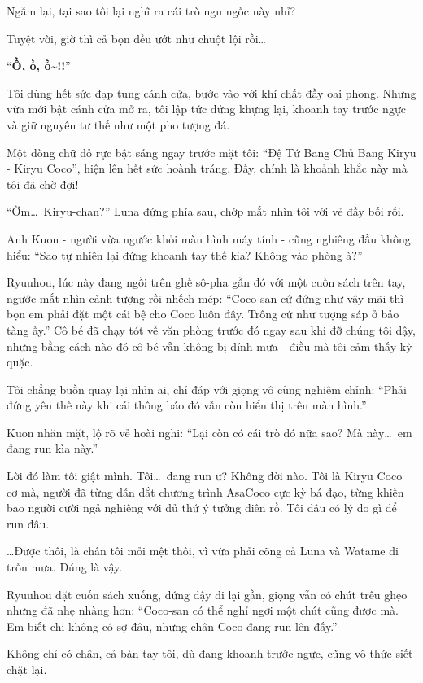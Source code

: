 \documentclass[../main.tex]{subfiles}
\begin{document}
Ngẫm lại, tại sao tôi lại nghĩ ra cái trò ngu ngốc này nhỉ?

Tuyệt vời, giờ thì cả bọn đều ướt như chuột lội rồi\dots

\ct

``\textbf{Ồ, ồ, ồ\~{}!!}''

Tôi dùng hết sức đạp tung cánh cửa, bước vào với khí chất đầy oai phong. Nhưng vừa mới bật cánh cửa mở ra, tôi lập tức đứng khựng lại, khoanh tay trước ngực và giữ nguyên tư thế như một pho tượng đá.

Một dòng chữ đỏ rực bật sáng ngay trước mặt tôi: ``Đệ Tứ Bang Chủ Bang Kiryu - Kiryu Coco'', hiện lên hết sức hoành tráng. Đấy, chính là khoảnh khắc này mà tôi đã chờ đợi!

``Ờm\dots\ Kiryu-chan?'' Luna đứng phía sau, chớp mắt nhìn tôi với vẻ đầy bối rối.

Anh Kuon - người vừa ngước khỏi màn hình máy tính - cũng nghiêng đầu không hiểu: ``Sao tự nhiên lại đứng khoanh tay thế kia? Không vào phòng à?''

Ryuuhou, lúc này đang ngồi trên ghế sô-pha gần đó với một cuốn sách trên tay, ngước mắt nhìn cảnh tượng rồi nhếch mép: ``Coco-san cứ đứng như vậy mãi thì bọn em phải đặt một cái bệ cho Coco luôn đây. Trông cứ như tượng sáp ở bảo tàng ấy.'' Cô bé đã chạy tót về văn phòng trước đó ngay sau khi đỡ chúng tôi dậy, nhưng bằng cách nào đó cô bé vẫn không bị dính mưa - điều mà tôi cảm thấy kỳ quặc.


Tôi chẳng buồn quay lại nhìn ai, chỉ đáp với giọng vô cùng nghiêm chỉnh: ``Phải đứng yên thế này khi cái thông báo đó vẫn còn hiển thị trên màn hình.''

Kuon nhăn mặt, lộ rõ vẻ hoài nghi: ``Lại còn có cái trò đó nữa sao? Mà này\dots\ em đang run kìa này.''

Lời đó làm tôi giật mình. Tôi\dots\ đang run ư? Không đời nào. Tôi là Kiryu Coco cơ mà, người đã từng dẫn dắt chương trình AsaCoco cực kỳ bá đạo, từng khiến bao người cười ngả nghiêng với đủ thứ ý tưởng điên rồ. Tôi đâu có lý do gì để run đâu.

\dots Được thôi, là chân tôi mỏi mệt thôi, vì vừa phải cõng cả Luna và Watame đi trốn mưa. Đúng là vậy.

Ryuuhou đặt cuốn sách xuống, đứng dậy đi lại gần, giọng vẫn có chút trêu ghẹo nhưng đã nhẹ nhàng hơn: ``Coco-san có thể nghỉ ngơi một chút cũng được mà. Em biết chị không có sợ đâu, nhưng chân Coco đang run lên đấy.''

Không chỉ có chân, cả bàn tay tôi, dù đang khoanh trước ngực, cũng vô thức siết chặt lại.
\end{document}

